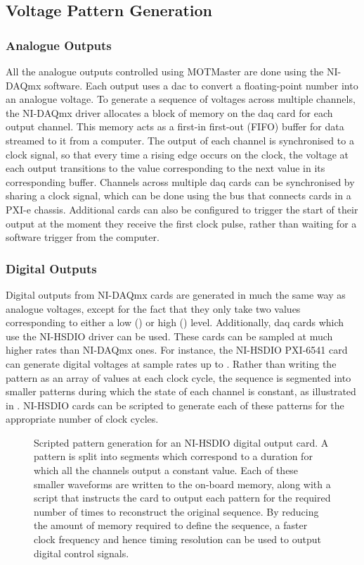 \subsection{Voltage Pattern Generation}\label{subsec:compinterface_patterngen}
\subsubsection{Analogue Outputs}
All the analogue outputs controlled using MOTMaster are done using the
NI-DAQmx software. Each output uses a \ac{dac} to convert a floating-point
number into an analogue voltage. To generate a sequence of voltages across
multiple channels, the NI-DAQmx driver allocates a block of memory on the
\ac{daq} card for each output channel. This memory acts as a first-in
first-out (FIFO) buffer for data streamed to it from a computer. The output
of each channel is synchronised to a clock signal, so that every time a
rising edge occurs on the clock, the voltage at each output transitions to
the value corresponding to the next value in its corresponding buffer.
Channels across multiple \ac{daq} cards can be synchronised by sharing a
clock signal, which can be done using the bus that connects cards in a PXI-e
chassis. Additional cards can also be configured to trigger the start of
their output at the moment they receive the first clock pulse, rather than
waiting for a software trigger from the computer. \par\noindent
\subsubsection{Digital Outputs} 
Digital outputs from NI-DAQmx cards are generated in much the same way as
analogue voltages, except for the fact that they only take two values
corresponding to either a low () or high
() level. Additionally, \ac{daq} cards which use the
NI-HSDIO driver can be used. These cards can be sampled at much higher rates than NI-DAQmx ones. For instance, the NI-HSDIO PXI-6541 card can generate
digital voltages at sample rates up to . Rather than writing the pattern as an array of
values at each clock cycle, the sequence is segmented into smaller patterns
during which the state of each channel is constant, as illustrated in
. NI-HSDIO cards can be scripted to generate each
of these patterns for the appropriate number of clock cycles.
\begin{figure}[!htbp]
    \centering
    
    \caption[Scripted pattern generation for an NI-HSDIO card]{Scripted
    pattern generation for an NI-HSDIO digital output card. A pattern is
    split into segments which correspond to a duration for which all the
    channels output a constant value. Each of these smaller waveforms are
    written to the on-board memory, along with a script that instructs the
    card to output each pattern for the required number of times to
    reconstruct the original sequence. By reducing the amount of memory
    required to define the sequence, a faster clock frequency and hence
    timing resolution can be used to output digital control
    signals.}\label{fig:hsdio_timing}
\end{figure}
